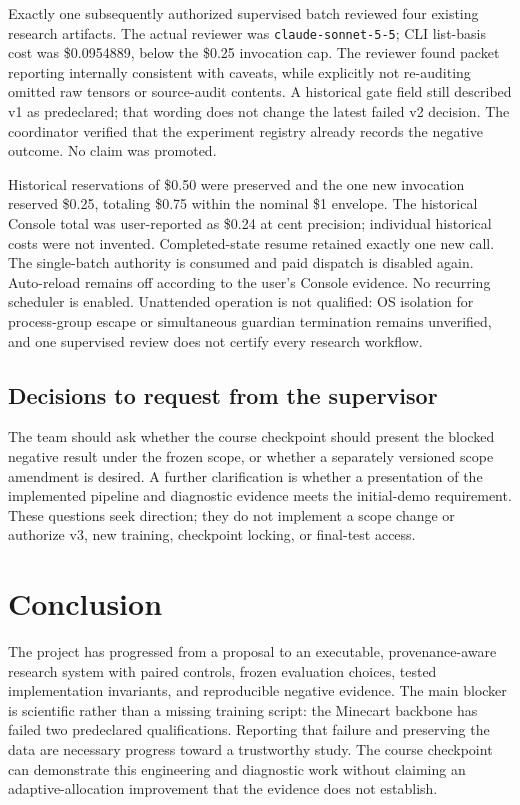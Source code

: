 Exactly one subsequently authorized supervised batch reviewed four existing
research artifacts. The actual reviewer was \texttt{claude-sonnet-5-5}; CLI
list-basis cost was \$0.0954889, below the \$0.25 invocation cap. The reviewer
found packet reporting internally consistent with caveats, while explicitly
not re-auditing omitted raw tensors or source-audit contents. A historical gate
field still described v1 as predeclared; that wording does not change the latest
failed v2 decision. The coordinator verified that the experiment registry already
records the negative outcome. No claim was promoted.

Historical reservations of \$0.50 were preserved and the one new invocation
reserved \$0.25, totaling \$0.75 within the nominal \$1 envelope. The historical
Console total was user-reported as \$0.24 at cent precision; individual historical
costs were not invented. Completed-state resume retained exactly one new call.
The single-batch authority is consumed and paid dispatch is disabled again.
Auto-reload remains off according to the user's Console evidence. No recurring
scheduler is enabled. Unattended operation is not qualified: OS isolation for
process-group escape or simultaneous guardian termination remains unverified,
and one supervised review does not certify every research workflow.

\subsection{Decisions to request from the supervisor}
The team should ask whether the course checkpoint should present the blocked
negative result under the frozen scope, or whether a separately versioned scope
amendment is desired. A further clarification is whether a presentation of the
implemented pipeline and diagnostic evidence meets the initial-demo requirement.
These questions seek direction; they do not implement a scope change or authorize
v3, new training, checkpoint locking, or final-test access.

\section{Conclusion}
The project has progressed from a proposal to an executable, provenance-aware
research system with paired controls, frozen evaluation choices, tested
implementation invariants, and reproducible negative evidence. The main
blocker is scientific rather than a missing training script: the Minecart
backbone has failed two predeclared qualifications. Reporting that failure and
preserving the data are necessary progress toward a trustworthy study.
The course checkpoint can demonstrate this engineering and diagnostic work
without claiming an adaptive-allocation improvement that the evidence does
not establish.

